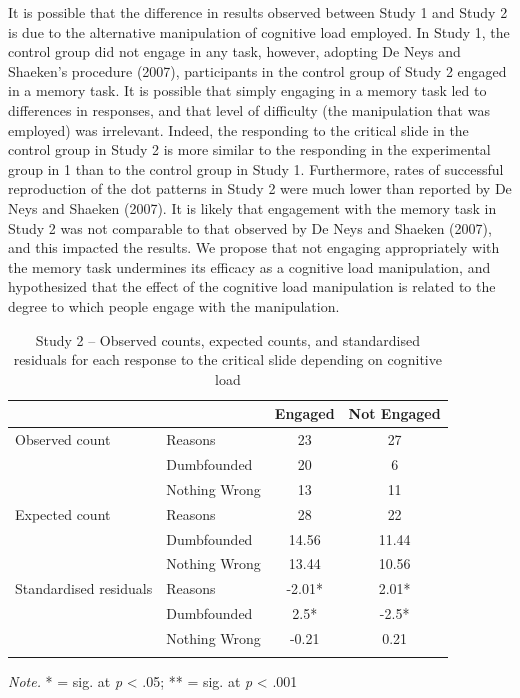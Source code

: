 \documentclass[
  american,
  man,floatsintext]{apa7}
\begin{document}
It is possible that the difference in results observed between Study 1 and Study 2 is due to the alternative manipulation of cognitive load employed. In Study 1, the control group did not engage in any task, however, adopting De Neys and Shaeken's procedure (2007), participants in the control group of Study 2 engaged in a memory task. It is possible that simply engaging in a memory task led to differences in responses, and that level of difficulty (the manipulation that was employed) was irrelevant. Indeed, the responding to the critical slide in the control group in Study 2 is more similar to the responding in the experimental group in 1 than to the control group in Study 1. Furthermore, rates of successful reproduction of the dot patterns in Study 2 were much lower than reported by De Neys and Shaeken (2007). It is likely that engagement with the memory task in Study 2 was not comparable to that observed by De Neys and Shaeken (2007), and this impacted the results. We propose that not engaging appropriately with the memory task undermines its efficacy as a cognitive load manipulation, and hypothesized that the effect of the cognitive load manipulation is related to the degree to which people engage with the manipulation.

\begin{table}[tbp]

\begin{center}
\begin{threeparttable}

\caption{\label{tab:S2S2tab1dumb}Study 2 – Observed counts, expected counts, and standardised residuals for each response to the critical slide depending on cognitive load}

\begin{tabular}{llcc}
\toprule
 & \multicolumn{1}{c}{} & \multicolumn{1}{c}{Engaged} & \multicolumn{1}{c}{Not Engaged}\\
\midrule
Observed count & Reasons & 23 & 27\\
 & Dumbfounded & 20 & 6\\
 & Nothing Wrong & 13 & 11\\
Expected count & Reasons & 28 & 22\\
 & Dumbfounded & 14.56 & 11.44\\
 & Nothing Wrong & 13.44 & 10.56\\
Standardised residuals & Reasons & -2.01* & 2.01*\\
 & Dumbfounded & 2.5* & -2.5*\\
 & Nothing Wrong & -0.21 & 0.21\\
\bottomrule
\addlinespace
\end{tabular}

\begin{tablenotes}[para]
\normalsize{\textit{Note.} * = sig. at \emph{p} < .05; ** = sig. at \emph{p} < .001}
\end{tablenotes}

\end{threeparttable}
\end{center}

\end{table}
\end{document}
